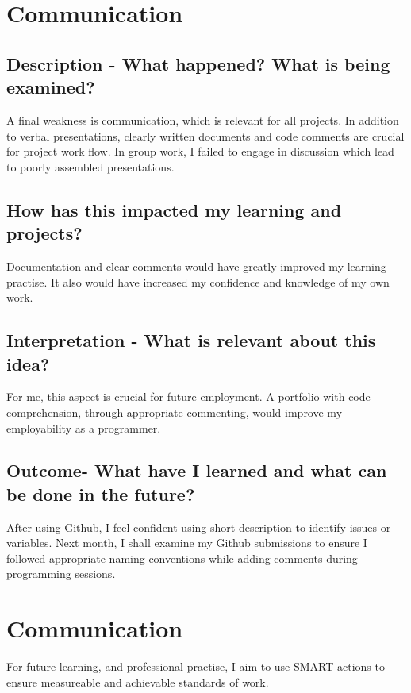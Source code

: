 \documentclass{scrartcl}
\begin{document}
\section{Communication}

\subsection{Description - What happened? What is being examined?}

A final weakness is communication, which is relevant for all projects. In addition to verbal presentations, clearly written documents and code comments are crucial for project work flow. In group work, I failed to engage in discussion which lead to poorly assembled presentations.

\subsection{How has this impacted my learning and projects?}

Documentation and clear comments would have greatly improved my learning practise. It also would have increased my confidence and knowledge of my own work.

\subsection{Interpretation - What is relevant about this idea?}

For me, this aspect is crucial for future employment. A portfolio with code comprehension, through appropriate commenting, would improve my employability as a programmer.

\subsection{Outcome- What have I learned and what can be done in the future?}

After using Github, I feel confident using short description to identify issues or variables. Next month, I shall examine my Github submissions to ensure I followed appropriate naming conventions while adding comments during programming sessions.

\section{Communication}

For future learning, and professional practise, I aim to use SMART actions to ensure measureable and achievable standards of work.

%
%
\end{document}
